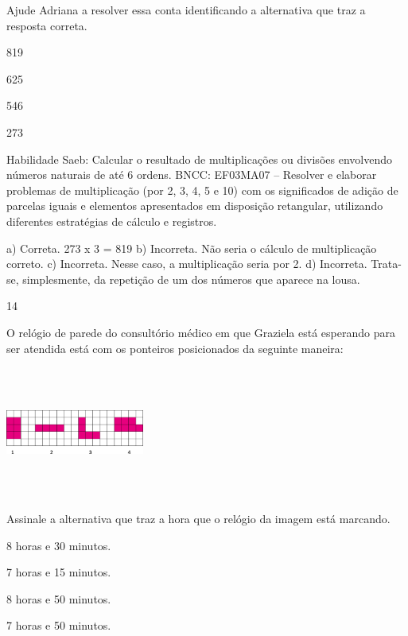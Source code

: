 \begin{multicols}{2}
{\begin{escolha}
{Ajude Adriana a resolver essa conta identificando a alternativa que traz a resposta correta.

\begin{escolha}
\item
  819
\item
  625
\item
  546
\item
  273
\end{escolha}

Habilidade Saeb: Calcular o resultado de multiplicações ou divisões
envolvendo números naturais de até 6 ordens.
BNCC: EF03MA07 – Resolver e elaborar problemas de multiplicação (por 2, 3, 4, 5 e 10) com os
significados de adição de parcelas iguais e elementos apresentados em disposição retangular,
utilizando diferentes estratégias de cálculo e registros.


a) Correta. 273 x 3 = 819
b) Incorreta. Não seria o cálculo de multiplicação correto.
c) Incorreta. Nesse caso, a multiplicação seria por 2.
d) Incorreta. Trata-se, simplesmente, da repetição de um dos números que aparece na lousa.

\num{14}

O relógio de parede do consultório médico em que Graziela está esperando
para ser atendida está com os ponteiros posicionados da seguinte maneira:


\includegraphics[width=1.79182in,height=1.69181in]{media/image115.png}

Assinale a alternativa que traz a hora que o relógio da imagem está marcando.

\begin{escolha}
\item
  8 horas e 30 minutos.
\item
  7 horas e 15 minutos.
\item
  8 horas e 50 minutos.
\item
  7 horas e 50 minutos.
\end{escolha}

}
\end{escolha}}
\end{multicols}
